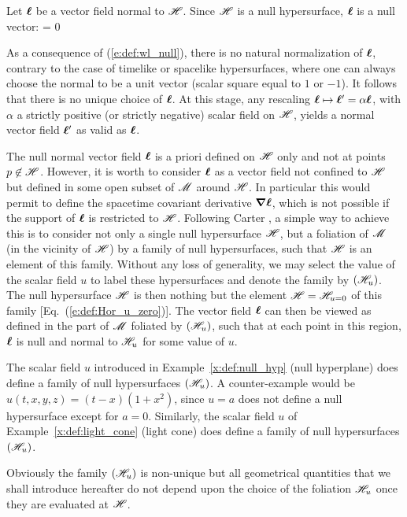 Let $\bm{\ell}$ be a vector field normal to $\mathscr{H}$. Since $\mathscr{H}$ is a null hypersurface,
$\bm{\ell}$ is a null vector:
\be \label{e:def:wl_null}
    \wl\cdot\wl = 0
\ee
\begin{remark}
As a consequence of (\ref{e:def:wl_null}), there is no natural normalization
of $\bm{\ell}$, contrary to the case of timelike or spacelike hypersurfaces,
where one can always choose the normal to be a unit vector
(scalar square equal to $1$ or $-1$). It follows that there is no unique choice
of $\bm{\ell}$. At this stage, any rescaling $\bm{\ell} \mapsto \bm{\ell}' =  \alpha \bm{\ell}$, with
$\alpha$ a strictly positive (or strictly negative) scalar field on $\mathscr{H}$,
yields a normal vector field $\bm{\ell}'$ as valid as $\bm{\ell}$.
\end{remark}
The null normal vector field $\bm{\ell}$ is a priori defined on $\mathscr{H}$
only and not at points $p\not\in\mathscr{H}$.
However, it is worth to consider $\bm{\ell}$ as a vector field
not confined to $\mathscr{H}$ but defined
in some open subset of $\mathscr{M}$ around $\mathscr{H}$.
In particular this would permit to define the spacetime covariant
derivative $\bm{\nabla}\bm{\ell}$, which is not possible if the
support of $\bm{\ell}$ is restricted to $\mathscr{H}$.
Following Carter \cite{Carte97}, a simple way to achieve
this is to consider not only a single null hypersurface $\mathscr{H}$,
but a foliation of $\mathscr{M}$ (in the vicinity
of $\mathscr{H}$) by a family of null hypersurfaces, such that $\mathscr{H}$ is an
element of this family.
Without any loss of generality,
we may select the value of the scalar field $u$ to label these hypersurfaces and
denote the family by $(\mathscr{H}_u)$. The null hypersurface $\mathscr{H}$
is then nothing but the element $\mathscr{H} = \mathscr{H}_{u=0}$ of this family
[Eq.~(\ref{e:def:Hor_u_zero})].
The vector field $\bm{\ell}$ can then be viewed as defined in the part of $\mathscr{M}$
foliated by $(\mathscr{H}_u)$, such that at each point in this region, $\bm{\ell}$
is null and normal to $\mathscr{H}_u$ for some value of $u$.

\begin{example}
The scalar field $u$ introduced in Example~\ref{x:def:null_hyp}
(null hyperplane) does define a family of null hypersurfaces
$(\mathscr{H}_u)$. A counter-example would be $u(t,x,y,z)=(t-x)(1+x^2)$, since
$u=a$ does not define a null hypersurface except for $a=0$.
Similarly, the scalar field $u$ of
Example~\ref{x:def:light_cone} (light cone) does define a family of null
hypersurfaces $(\mathscr{H}_u)$.
\end{example}

Obviously the family $(\mathscr{H}_u)$ is non-unique but all geometrical
quantities that we shall introduce hereafter do not depend upon the choice
of the foliation $\mathscr{H}_u$ once they are evaluated at $\mathscr{H}$.

